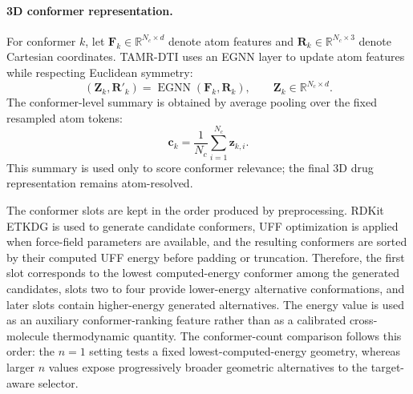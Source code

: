 \paragraph{3D conformer representation.}
For conformer $k$, let
$\mathbf{F}_k\in\mathbb{R}^{N_c\times d}$ denote atom features and
$\mathbf{R}_k\in\mathbb{R}^{N_c\times 3}$ denote Cartesian coordinates. TAMR-DTI
uses an EGNN layer to update atom features while respecting Euclidean symmetry:
\begin{equation}
  (\mathbf{Z}_k,\mathbf{R}'_k)
  =
  \operatorname{EGNN}(\mathbf{F}_k,\mathbf{R}_k),
  \qquad
  \mathbf{Z}_k\in\mathbb{R}^{N_c\times d}.
  \label{eq:egnn_conformer}
\end{equation}
The conformer-level summary is obtained by average pooling over the fixed
resampled atom tokens:
\begin{equation}
  \mathbf{c}_k =
  \frac{1}{N_c}\sum_{i=1}^{N_c}\mathbf{z}_{k,i}.
  \label{eq:conformer_global}
\end{equation}
This summary is used only to score conformer relevance; the final 3D drug
representation remains atom-resolved.

The conformer slots are kept in the order produced by preprocessing. RDKit
ETKDG is used to generate candidate conformers, UFF optimization is applied when
force-field parameters are available, and the resulting conformers are sorted by
their computed UFF energy before padding or truncation. Therefore, the first slot
corresponds to the lowest computed-energy conformer among the generated
candidates, slots two to four provide lower-energy alternative conformations,
and later slots contain higher-energy generated alternatives. The energy value
is used as an auxiliary conformer-ranking feature rather than as a calibrated
cross-molecule thermodynamic quantity. The conformer-count comparison follows
this order: the $n=1$ setting tests a fixed lowest-computed-energy
geometry, whereas larger $n$ values expose progressively broader geometric
alternatives to the target-aware selector.

